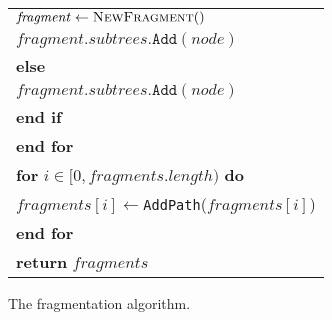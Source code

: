 \begin{figure}[]
\begin{tabular}{l}
		\makebox[1em][r]{12:}\hspace{9 mm} $\mathit{fragment} \leftarrow  \textsc{NewFragment}()$ \\
		\makebox[1em][r]{13:}\hspace{9 mm} $fragment.subtrees.\texttt{Add}(node)$ \\
		\makebox[1em][r]{14:}\hspace{5 mm}  \textbf{else}\\
		\makebox[1em][r]{15:}\hspace{9 mm} $fragment.subtrees.\texttt{Add}(node)$  \\
		\makebox[1em][r]{16:}\hspace{5 mm}  \textbf{end if}\\
		\makebox[1em][r]{17:}\hspace{1 mm}  \textbf{end for}\\
		\makebox[1em][r]{18:}\hspace{1 mm}  \textbf{for} $i \in [0, \mathit{fragments}.length)$ \textbf{do}\\
		\makebox[1em][r]{19:}\hspace{5 mm}  $\mathit{fragments}[i] \leftarrow $\texttt{AddPath}($\mathit{fragments}[i]$)  \\
		\makebox[1em][r]{20:}\hspace{1 mm}  \textbf{end for}\\
		\makebox[1em][r]{21:}\hspace{1 mm}  \textbf{return} $\mathit{fragments}$\\
		\hline
	\end{tabular}
	\caption{The fragmentation algorithm.}
	\label{fig:algQuery1}
\end{figure}


